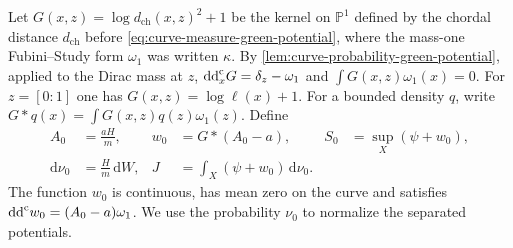 Let $G(x,z)=\log d_{\mathrm{ch}}(x,z)^2+1$ be the kernel on $\mathbb P^1$ defined by the chordal distance $d_{\mathrm{ch}}$ before \eqref{eq:curve-measure-green-potential}, where the mass-one Fubini--Study form $\omega_1$ was written $\kappa$. By \cref{lem:curve-probability-green-potential}, applied to the Dirac mass at $z$, $\mathrm{dd}^{\mathrm{c}}_xG=\delta_z-\omega_1$ and $\int G(x,z)\omega_1(x)=0$. For $z=[0:1]$ one has $G(x,z)=\log\ell(x)+1$. For a bounded density $q$, write $G*q(x)=\int G(x,z)q(z)\omega_1(z)$. Define
\begin{equation}\label{eq:logarithmic-selected-residual}
 \begin{aligned}
 A_0&=\frac{aH}{m},&w_0&=G*(A_0-a),&S_0&=\sup_X(\psi+w_0),\\
 \mathrm{d}\nu_0&=\frac Hm\,\mathrm{d}W,&J&=\int_X(\psi+w_0)\,\mathrm{d}\nu_0.
 \end{aligned}
\end{equation}
The function $w_0$ is continuous, has mean zero on the curve and satisfies $\mathrm{dd}^{\mathrm{c}} w_0=(A_0-a)\omega_1$. We use the probability $\nu_0$ to normalize the separated potentials.

